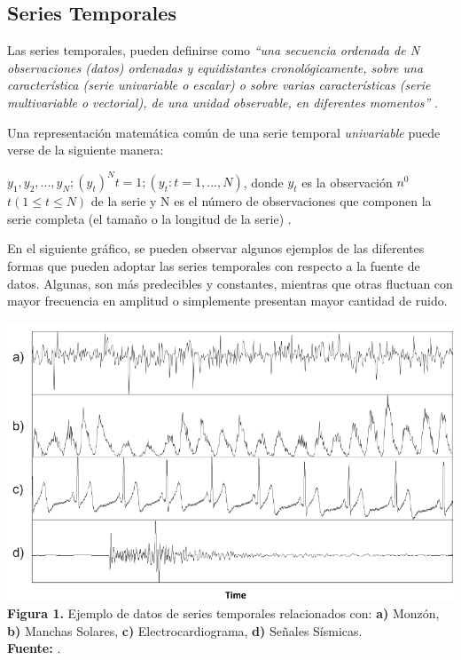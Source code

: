 \subsection{Series Temporales}
Las series temporales, pueden definirse como \textit{\enquote{una secuencia ordenada de N observaciones (datos) ordenadas y equidistantes cronol\'ogicamente, sobre una caracter\'istica (serie univariable o escalar) o sobre varias caracter\'isticas (serie multivariable o vectorial), de una unidad observable, en diferentes momentos}} \cite{tak-chung}.\par
Una representaci\'on matem\'atica com\'un de una serie temporal \textit{univariable} puede verse de la siguiente manera:\par
$y_1, y_2,...,y_N; (y_t)^N t=1; (y_t:t=1,...,N)$, donde $y_t$ es la observaci\'on $n^0$ $t(1 \leq t \leq N)$ de la serie y N es el n\'umero de observaciones que componen la serie completa (el tama\~no o la longitud de la serie) \cite{concepts}.\par
En el siguiente gr\'afico, se pueden observar algunos ejemplos de las diferentes formas que pueden adoptar las series temporales con respecto a la fuente de datos. Algunas, son m\'as predecibles y constantes, mientras que otras fluctuan con mayor frecuencia en amplitud o simplemente presentan mayor cantidad de ruido.
\begin{center}
\includegraphics[scale=0.7]{timeSeries.png}\\
\vspace*{10pt}
\footnotesize{
\textbf{Figura 1.} Ejemplo de datos de series temporales relacionados con: \textbf{a)} Monz\'on, \textbf{b)} Manchas Solares, \textbf{c)} Electrocardiograma, \textbf{d)} Se\~nales S\'ismicas.
}\\ \textbf{Fuente:} \cite{concepts}.
\end{center}
